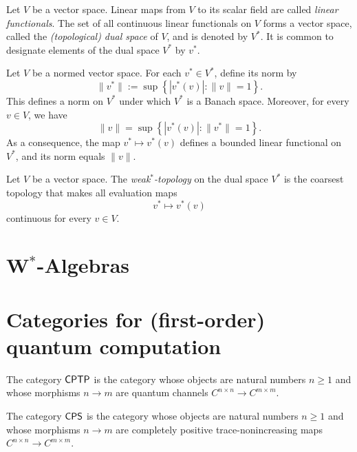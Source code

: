 \begin{definition}
  Let $V$ be a vector space. 
  Linear maps from $V$ to its scalar field are called \emph{linear functionals}. The set of all continuous linear functionals on $V$ forms a vector space, called the \emph{(topological) dual space} of $ V $, and is denoted by $V^*$. It is common to designate elements of the dual space \( V^* \)  by \( v^* \).  %
\end{definition}



\begin{theorem} %
Let \( V \) be a normed vector space. For each \( v^* \in V^* \), define its norm by
\[
\|v^*\| := \sup \left\{ | v^*(v) | : \|v\| = 1 \right\}.
\]
This defines a norm on \( V^* \) under which \( V^* \) is a Banach space. Moreover, for every \( v \in V \), we have
\[
\|v\| = \sup \left\{ | v^*(v) | : \|v^*\| = 1 \right\}.
\]
As a consequence, the map \( v^* \mapsto v^*(v)  \) defines a bounded linear functional on \( V^* \), and its norm equals \( \|v\| \).
\end{theorem}

\begin{definition}
Let \( V \) be a vector space. The \emph{weak\(^*\)-topology} on the dual space \( V^* \) is the coarsest topology that makes all evaluation maps
\[
v^* \mapsto v^*(v) 
\]
continuous for every \( v \in V \).
\end{definition}



\section{W$^*$-Algebras}

\section{Categories for (first-order) quantum computation}

\begin{example} \label{ex:cat_cptp}
The category $\mathsf{CPTP}$ is the category whose objects are natural numbers $n \geq 1$ and whose morphisms $n \rightarrow m$ are quantum channels $C^{n \times n} \rightarrow C^{m\times m}$.
\end{example}

\begin{example} \label{ex:cat_cps}
The category $\mathsf{CPS}$ is the category whose objects are natural numbers $n \geq 1$ and whose morphisms $n \rightarrow m$ are completely positive trace-nonincreasing maps $C^{n \times n} \rightarrow C^{m\times m}$.
\end{example}



